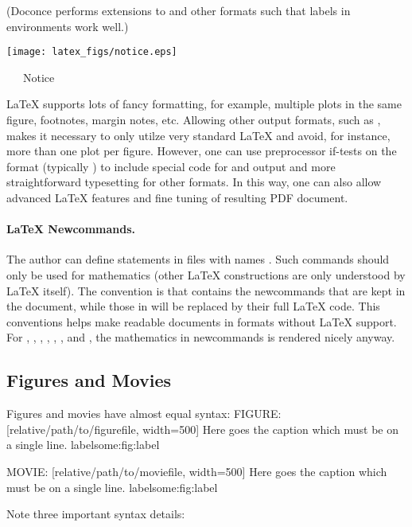 \documentclass[%
oneside,                 %
final,                   %
10pt]{article}
\newenvironment{noticeshaded}
{\def\FrameCommand{\fboxsep=3mm\colorbox{noticebackground}}
 \MakeFramed {\advance\hsize-\width \FrameRestore}}{\endMakeFramed}
\newenvironment{noticeadmon}{
\begin{noticeshaded}
\noindent
\texttt{[image: latex\_figs/notice.eps]}
}
{
\end{noticeshaded}
}
\begin{document}
\noindent
(Doconce performs extensions to  and other formats such that
labels in  environments work well.)


\begin{noticeadmon}
\ \ \ {\large\sc Notice}\\ \par
\nobreak\noindent\ignorespaces
{\LaTeX} supports lots of fancy formatting, for example, multiple
plots in the same figure, footnotes, margin notes, etc.
Allowing other output formats, such as , makes it necessary
to only utilze very standard {\LaTeX} and avoid, for instance, more than
one plot per figure. However, one can use preprocessor if-tests on
the format (typically ) to
include special code for  and  output and more
straightforward typesetting for other formats. In this way, one can
also allow advanced {\LaTeX} features and fine tuning of resulting
PDF document.
\end{noticeadmon}
\paragraph{LaTeX Newcommands.}
The author can define  statements in files with names
. Such commands should only be used for mathematics
(other {\LaTeX} constructions are only understood by {\LaTeX} itself).
The convention is that 
contains the newcommands that are kept in the document, while
those in  will be replaced by their full
{\LaTeX} code. This conventions helps make readable documents in formats
without {\LaTeX} support. For , , , ,
, , and , the mathematics in newcommands is
rendered nicely anyway.


\subsection{Figures and Movies}

Figures and movies have almost equal syntax:
\bccq
FIGURE: [relative/path/to/figurefile, width=500] Here goes the caption which must be on a single line. label{some:fig:label}

MOVIE: [relative/path/to/moviefile, width=500] Here goes the caption which must be on a single line. label{some:fig:label}

\eccq
Note three important syntax details:
\end{document}

